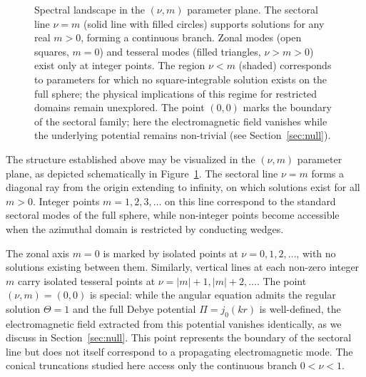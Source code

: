 \documentclass[
  aip,
  amsmath,amssymb,
  preprint
]{revtex4-1}
\begin{document}
\begin{figure}[t]

\caption{Spectral landscape in the $(\nu, m)$ parameter plane. The sectoral line $\nu = m$ (solid line with filled circles) supports solutions for any real $m > 0$, forming a continuous branch. Zonal modes (open squares, $m = 0$) and tesseral modes (filled triangles, $\nu > m > 0$) exist only at integer points. The region $\nu < m$ (shaded) corresponds to parameters for which no square-integrable solution exists on the full sphere; the physical 
implications of this regime for restricted domains remain unexplored. The point $(0,0)$ marks the boundary of the sectoral family; here the electromagnetic field vanishes while the underlying potential remains non-trivial (see Section~\ref{sec:null}).}
\label{fig:spectral_landscape}
\end{figure}

The structure established above may be visualized in the $(\nu, m)$ parameter plane, as depicted schematically in Figure~\ref{fig:spectral_landscape}. The sectoral line $\nu = m$ forms a diagonal ray from the origin extending to infinity, on which solutions exist for all $m > 0$. Integer points $m = 1, 2, 3, \ldots$ on this line correspond to the standard sectoral modes of the full sphere, while non-integer points become accessible when the azimuthal domain is restricted by conducting wedges.

The zonal axis $m = 0$ is marked by isolated points at $\nu = 0, 1, 2, \ldots$, with no solutions existing between them. Similarly, vertical lines at each non-zero integer $m$ carry isolated tesseral points at $\nu = |m|+1, |m|+2, \ldots$. The point $(\nu, m) = (0, 0)$ is special: while the angular equation admits the regular solution $\Theta = 1$ and the full Debye potential $\Pi = j_0(kr)$ is well-defined, the electromagnetic field extracted from this potential vanishes identically, as we discuss in Section~\ref{sec:null}. This point represents the boundary of the sectoral line but does not itself correspond to a propagating electromagnetic mode. The conical truncations studied here access only the continuous branch $0<\nu<1$.
\end{document}
